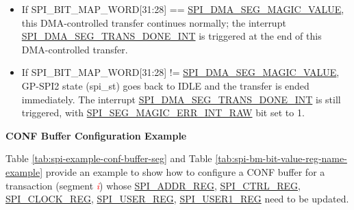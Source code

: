 \documentclass[main\_\_EN.tex]{subfiles}
\begin{document}
    \begin{itemize}
        \item If SPI\_BIT\_MAP\_WORD[31:28] == \hyperref[fielddesc:SPIDMASEGMAGICVALUE]{SPI\_DMA\_SEG\_MAGIC\_VALUE}, this DMA-controlled transfer continues normally; the interrupt \hyperref[int:SPIDMASEGTRANSDONEINT]{SPI\_DMA\_SEG\_TRANS\_DONE\_INT} is triggered at the end of this DMA-controlled transfer.
        \item If SPI\_BIT\_MAP\_WORD[31:28] != \hyperref[fielddesc:SPIDMASEGMAGICVALUE]{SPI\_DMA\_SEG\_MAGIC\_VALUE}, GP-SPI2 state (spi\_st) goes back to IDLE and the transfer is ended immediately. The interrupt \hyperref[int:SPIDMASEGTRANSDONEINT]{SPI\_DMA\_SEG\_TRANS\_DONE\_INT} is still triggered, with \hyperref[fielddesc:SPISEGMAGICERRINTRAW]{SPI\_SEG\_MAGIC\_ERR\_INT\_RAW} bit set to 1.
    \end{itemize}

\textbf{CONF Buffer Configuration Example}\label{other:spi-para-config-conf-buffer-example}

Table \ref{tab:spi-example-conf-buffer-seg} and Table \ref{tab:spi-bm-bit-value-reg-name-example} provide an example to show how to configure a CONF buffer for a transaction (segment \textcolor{red}{\it i}) whose \hyperref[regdesc:SPIADDRREG]{SPI\_ADDR\_REG}, \hyperref[regdesc:SPICTRLREG]{SPI\_CTRL\_REG}, \hyperref[regdesc:SPICLOCKREG]{SPI\_CLOCK\_REG},
\hyperref[regdesc:SPIUSERREG]{SPI\_USER\_REG},
\hyperref[regdesc:SPIUSER1REG]{SPI\_USER1\_REG} need to be updated.
\end{document}

